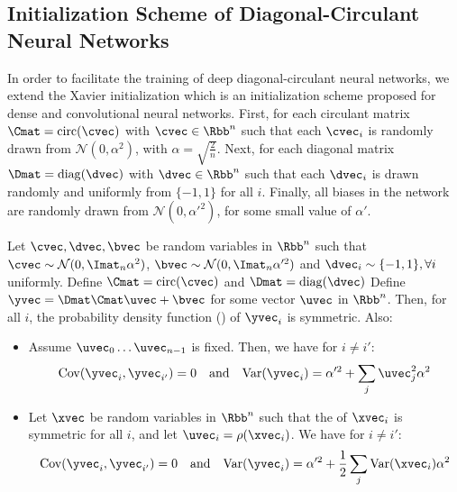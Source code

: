 \subsection{Initialization Scheme of Diagonal-Circulant Neural Networks}
\label{subsection:ch4-initialization_scheme_of_diagonal-circulant_neural_networks}

In order to facilitate the training of deep diagonal-circulant neural networks, we extend the Xavier initialization \cite{glorot2010understanding} which is an initialization scheme proposed for dense and convolutional neural networks.
First, for each circulant matrix $\Cmat = \circulant (\cvec)$ with $\cvec \in \Rbb^n$ such that each $\cvec_i$ is randomly drawn from $\mathcal{N} \left(0,\alpha^2\right)$, with $\alpha = \sqrt{\frac{2}{n}}$.
Next, for each diagonal matrix $\Dmat = \diagonal (\dvec)$ with $\dvec \in \Rbb^n$ such that each $\dvec_{i}$ is drawn randomly and uniformly from $\{-1,1\}$ for all $i$.
Finally, all biases in the network are randomly drawn from $\mathcal{N}\left(0,\alpha'^{2}\right)$, for some small value of $\alpha'$.


\begin{lemma} \label{lemma:ch4-covariance}
  Let $\cvec, \dvec, \bvec$ be random variables in $\Rbb^n$ such that $\cvec \sim \mathcal{N}(0, \Imat_n\alpha^2)$, $\bvec \sim \mathcal{N}(0, \Imat_n\alpha'^2)$ and $\dvec_i \sim \{-1, 1\}, \forall i$ uniformly.
  Define $\Cmat = \circulant(\cvec)$ and $\Dmat = \diagonal(\dvec)$
  Define $\yvec = \Dmat \Cmat \uvec + \bvec$ for some vector $\uvec$ in $\Rbb^n$.
  Then, for all $i$, the probability density function (\pdf) of $\yvec_{i}$ is symmetric.
  Also:
  \begin{itemize}
    \item Assume $\uvec_0 \ldots \uvec_{n-1}$ is fixed. Then, we have for $i \neq i'$:
      \begin{equation}
	\Cov(\yvec_i, \yvec_{i'}) = 0 \quad \text{and} \quad
	\Var(\yvec_i) = \alpha'^2 + \sum_{j} \uvec_{j}^{2} \alpha^{2}
      \end{equation}
    \item Let $\xvec$ be random variables in $\Rbb^n$ such that the \pdf of $\xvec_i$ is symmetric for all $i$, and let $\uvec_i = \rho(\xvec_i)$.
      We have for $i \neq i':$
      \begin{equation}
	\Cov(\yvec_i, \yvec_{i'}) = 0 \quad \text{and} \quad
	\Var(\yvec_i) = \alpha'^2 + \frac{1}{2} \sum_{j} \Var(\xvec_i) \alpha^2
      \end{equation}
  \end{itemize}
\end{lemma}

